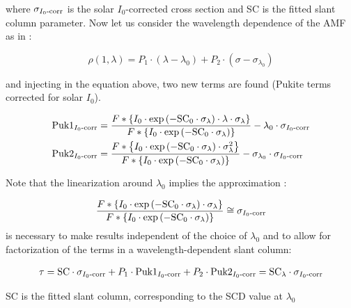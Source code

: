 where $\sigma_{I_0\mathrm{\textnormal{-}corr}}$ is the solar $I_0$-corrected cross section and SC is the fitted slant column parameter.
Now let us consider the wavelength dependence of the AMF as in \citet{Pukite2010}:

\begin{equation}
\rho\left( 1,\lambda\right) =P_1\cdot\left( \lambda-\lambda_0 \right) +P_2\cdot\left( \sigma-\sigma_{\lambda_0}\right)
\end{equation}

and injecting in the equation above, two new terms are found (Pukite terms corrected for solar $I_0$).

\begin{align}
\mathrm{Puk1}_{I_0\mathrm{\textnormal{-}corr}}&=\frac{F*\left\{ I_0\cdot\exp\left( -\mathrm{SC}_0\cdot\sigma_\lambda\right)\cdot\lambda\cdot\sigma_\lambda\right\} }{ F*\left\{ I_0\cdot\exp\left( -\mathrm{SC}_0\cdot\sigma_\lambda\right) \right\} }-\lambda_0\cdot\sigma_{I_0\mathrm{\textnormal{-}corr}}  \\
\mathrm{Puk2}_{I_0\mathrm{\textnormal{-}corr}}&=\frac{F*\left\{ I_0\cdot\exp\left( -\mathrm{SC}_0\cdot\sigma_\lambda\right)\cdot\sigma_\lambda^2\right\} }{ F*\left\{ I_0\cdot\exp\left( -\mathrm{SC}_0\cdot\sigma_\lambda\right) \right\} }-\sigma_{\lambda_0}\cdot\sigma_{I_0\mathrm{\textnormal{-}corr}}
\end{align}

Note that the linearization around $\lambda_0$ implies the approximation :

\begin{equation}
\frac{F*\left\{ I_0\cdot\exp\left( -\mathrm{SC}_0\cdot\sigma_\lambda\right) \cdot\sigma_\lambda\right\} }{ F*\left\{ I_0\cdot\exp\left( -\mathrm{SC}_0\cdot\sigma_\lambda\right) \right\} } \cong\sigma_{I_0\mathrm{\textnormal{-}corr}}
\end{equation}
is necessary to make results independent of the choice of $\lambda_0$ and to allow for factorization of the terms in a wavelength-dependent slant column:

\begin{equation}
\tau=\mathrm{SC}\cdot\sigma_{I_0\mathrm{\textnormal{-}corr}}+P_1\cdot\mathrm{Puk1}_{I_0\mathrm{\textnormal{-}corr}}+P_2\cdot\mathrm{Puk2}_{I_0\mathrm{\textnormal{-}corr}}=\mathrm{SC}_\lambda\cdot\sigma_{I_0\mathrm{\textnormal{-}corr}}
\end{equation}

SC is the fitted slant column, corresponding to the SCD value at $\lambda_0$

